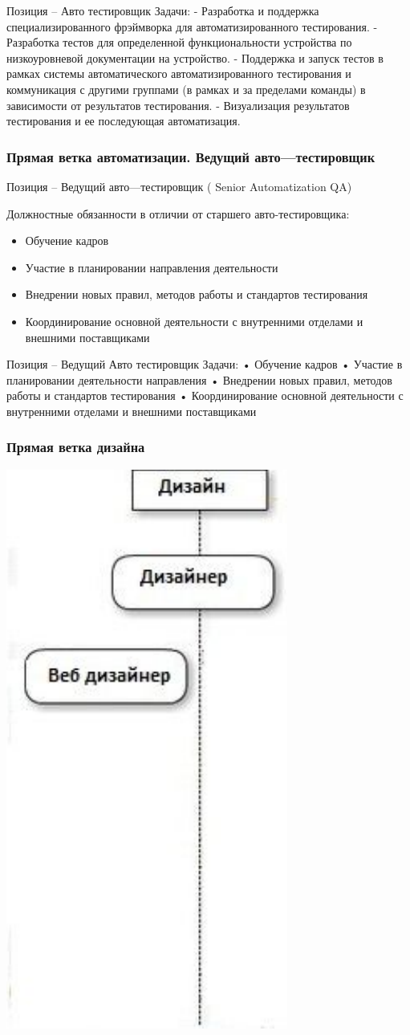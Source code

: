 \documentclass{../industrial-development}
\begin{document}
\lecturenotes
Позиция – Авто тестировщик
Задачи:
- Разработка и поддержка специализированного фрэймворка для автоматизированного тестирования.
- Разработка тестов для определенной функциональности устройства по низкоуровневой документации на устройство.
- Поддержка и запуск тестов в рамках системы автоматического автоматизированного тестирования и коммуникация с другими группами (в рамках и за пределами команды) в зависимости от результатов тестирования.
- Визуализация результатов тестирования и ее последующая автоматизация.

\begin{frame} \frametitle{Прямая ветка автоматизации. Ведущий авто---тестировщик }
 \begin{block}{}
  \alert{Позиция – Ведущий авто---тестировщик ( Senior Automatization QA)}

Должностные обязанности в отличии от старшего авто-тестировщика: 
  \end{block}
  \begin{itemize}
  \item Обучение кадров
  \item  Участие в планировании направления деятельности
  \item Внедрении новых правил, методов работы и стандартов тестирования
 \item Координирование основной деятельности с внутренними отделами и внешними поставщиками
  \end{itemize}
\end{frame}

\lecturenotes
Позиция – Ведущий Авто тестировщик
Задачи:
•	Обучение кадров
•	Участие в планировании деятельности направления
•	Внедрении новых правил, методов работы и стандартов тестирования
•	Координирование основной деятельности с внутренними отделами и внешними поставщиками

\begin{frame} \frametitle{Прямая ветка дизайна }
  \centerline{\includegraphics[width=0.27\linewidth]{11-IT-specialist's-way/sch11d.pdf}}
\end{frame}
\end{document}
